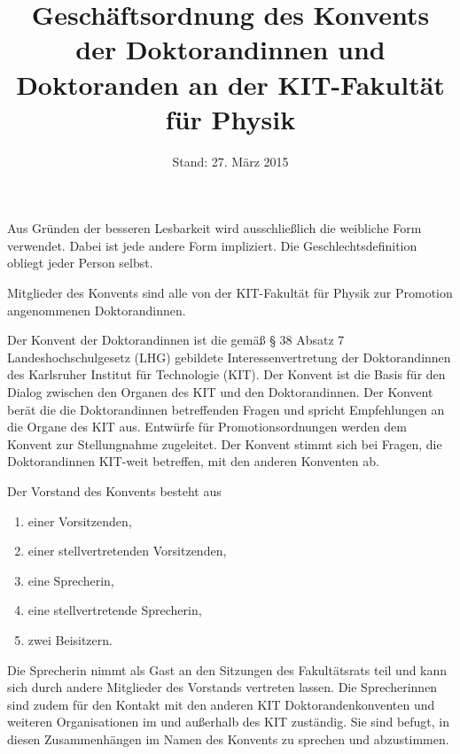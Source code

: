\documentclass[a4paper, parskip=half, numbers=noenddot]{scrartcl}
\title{Geschäftsordnung des Konvents der Doktorandinnen und Doktoranden an der KIT-Fakultät für Physik}
\date{Stand: 27. März 2015}
\begin{document}
%
%

\maketitle



\begin{contract}


\tableofcontents

Aus Gründen der besseren Lesbarkeit wird ausschließlich die weibliche Form verwendet. Dabei ist jede andere Form impliziert. Die Geschlechtsdefinition obliegt jeder Person selbst.


Mitglieder des Konvents sind alle von der KIT-Fakultät für Physik zur Promotion angenommenen Doktorandinnen. 

%
\label{aufgaben}

Der Konvent der Doktorandinnen ist die gemäß § 38 Absatz 7 Landeshochschulgesetz (LHG) gebildete Interessenvertretung der Doktorandinnen des Karlsruher Institut für Technologie (KIT). Der Konvent ist die Basis für den Dialog zwischen den Organen des KIT und den Doktorandinnen. Der Konvent berät die die Doktorandinnen betreffenden Fragen und spricht Empfehlungen an die Organe des KIT aus. Entwürfe für Promotionsordnungen werden dem Konvent zur Stellungnahme zugeleitet. Der Konvent stimmt sich bei Fragen, die Doktorandinnen KIT-weit betreffen, mit den anderen Konventen ab.


Der Vorstand des Konvents besteht aus
\begin{enumerate}
	\item einer Vorsitzenden,
	\item einer stellvertretenden Vorsitzenden,
	\item eine Sprecherin,
	\item eine stellvertretende Sprecherin,
	\item zwei Beisitzern.
\end{enumerate}
Die Sprecherin nimmt als Gast an den Sitzungen des Fakultätsrats teil und
kann sich durch andere Mitglieder des Vorstands vertreten lassen.
Die Sprecherinnen sind zudem für den Kontakt mit den anderen KIT Doktorandenkonventen und weiteren Organisationen im und außerhalb des KIT zuständig. Sie sind befugt, in diesen Zusammenhängen im Namen des Konvents zu sprechen und abzustimmen.


\end{contract}
\end{document}
